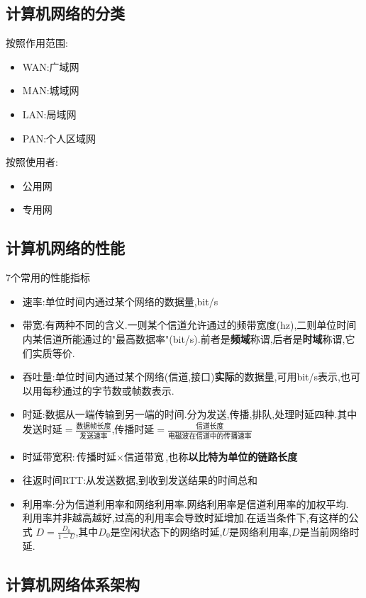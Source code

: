 \documentclass{ctexart}
\begin{document}
\subsection{计算机网络的分类}
按照作用范围:
\begin{itemize}
    \item WAN:广域网
    \item MAN:城域网
    \item LAN:局域网
    \item PAN:个人区域网
\end{itemize}
按照使用者:

\begin{itemize}
    \item 公用网
    \item 专用网
\end{itemize}

\subsection{计算机网络的性能}
7个常用的性能指标
\begin{itemize}
    \item 速率:单位时间内通过某个网络的数据量,bit/s
    \item 带宽:有两种不同的含义.一则某个信道允许通过的频带宽度(hz),二则单位时间内某信道所能通过的"最高数据率"(bit/s).前者是\textbf{频域}称谓,后者是\textbf{时域}称谓,它们实质等价.
    \item 吞吐量:单位时间内通过某个网络(信道,接口)\textbf{实际}的数据量,可用bit/s表示,也可以用每秒通过的字节数或帧数表示.
    \item 时延:数据从一端传输到另一端的时间.分为发送,传播,排队,处理时延四种.其中$\mbox{发送时延}=\frac{\mbox{数据帧长度}}{\mbox{发送速率}}$,$\mbox{传播时延}=\frac{\mbox{信道长度}}{\mbox{电磁波在信道中的传播速率}}$
    \item 时延带宽积:$\mbox{传播时延}\times\mbox{信道带宽}$,也称\textbf{以比特为单位的链路长度}
    \item 往返时间RTT:从发送数据,到收到发送结果的时间总和
    \item 利用率:分为信道利用率和网络利用率.网络利用率是信道利用率的加权平均.\\
    利用率并非越高越好,过高的利用率会导致时延增加.在适当条件下,有这样的公式
    $D=\frac{D_0}{1-U}$,其中$D_0$是空闲状态下的网络时延,$U$是网络利用率,$D$是当前网络时延.
\end{itemize}
\subsection{计算机网络体系架构}
\end{document}

